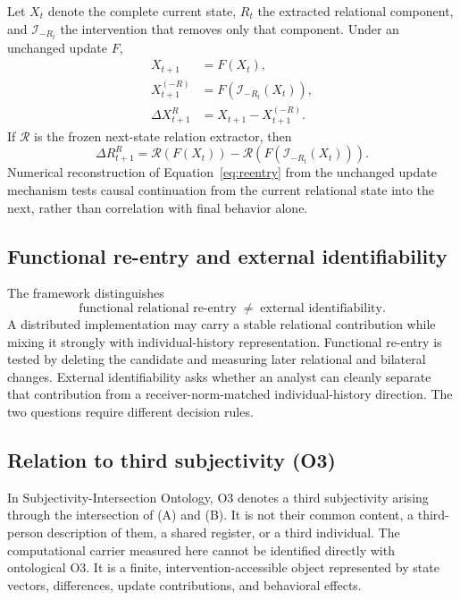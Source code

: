 \documentclass[11pt,a4paper]{article}
\begin{document}
Let $X_t$ denote the complete current state, $R_t$ the extracted relational component, and $\mathcal I_{-R_t}$ the intervention that removes only that component. Under an unchanged update $F$,
\begin{align}
 X_{t+1} &= F(X_t),\\
 X^{(-R)}_{t+1} &= F(\mathcal I_{-R_t}(X_t)),\\
 \Delta X^{R}_{t+1} &= X_{t+1}-X^{(-R)}_{t+1}.
 \label{eq:delta}
\end{align}
If \(\mathcal R\) is the frozen next-state relation extractor, then
\begin{equation}
 \Delta R^{R}_{t+1}
 = \mathcal R(F(X_t))
 - \mathcal R(F(\mathcal I_{-R_t}(X_t))).
 \label{eq:reentry}
\end{equation}
Numerical reconstruction of Equation~\eqref{eq:reentry} from the unchanged update mechanism tests causal continuation from the current relational state into the next, rather than correlation with final behavior alone.

\subsection{Functional re-entry and external identifiability}

The framework distinguishes
\begin{equation}
  \text{functional relational re-entry}
  \;\neq\;
  \text{external identifiability}.
  \label{eq:distinct}
\end{equation}
A distributed implementation may carry a stable relational contribution while mixing it strongly with individual-history representation. Functional re-entry is tested by deleting the candidate and measuring later relational and bilateral changes. External identifiability asks whether an analyst can cleanly separate that contribution from a receiver-norm-matched individual-history direction. The two questions require different decision rules.

\subsection{Relation to third subjectivity (O3)}

In Subjectivity-Intersection Ontology, O3 denotes a third subjectivity arising through the intersection of (A) and (B). It is not their common content, a third-person description of them, a shared register, or a third individual. The computational carrier measured here cannot be identified directly with ontological O3. It is a finite, intervention-accessible object represented by state vectors, differences, update contributions, and behavioral effects.
\end{document}
